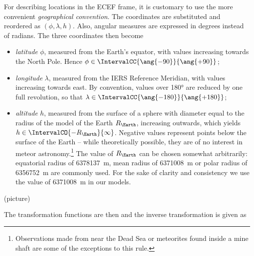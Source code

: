         For describing locations in the ECEF frame, it is customary to use the
        more convenient \emph{geographical convention}. The coordinates are substituted
        and reordered as $(\phi, \lambda, h)$.
        Also, angular measures are expressed in degrees instead of radians.
        The three coordinates then become
        \begin{itemize}
            \item \emph{latitude} $\phi$,
                measured from the Earth's equator, with values increasing towards the North Pole.
                Hence $\phi \in \IntervalCC{\ang{-90}}{\ang{+90}}$;
            \item \emph{longitude} $\lambda$, measured from the IERS Reference Meridian,
                with values increasing towards east. By convention, values over \ang{180} are
                reduced by one full revolution, so that $\lambda \in \IntervalCC{\ang{-180}}{\ang{+180}}$;
            \item \emph{altitude} $h$, measured from the surface of a sphere
                with diameter equal to the radius of the model of the Earth $R_\Earth$, increasing outwards,
                which yields $h \in \IntervalCO{-R_\Earth}{\infty}$.
                Negative values represent points below the surface of the Earth --
                while theoretically possible, they are of no interest in meteor
                astronomy.\footnote{Observations made from near the Dead Sea or meteorites
                found inside a mine shaft are some of the exceptions to this rule.}
                The value of $R_\Earth$ can be chosen somewhat arbitrarily:
                equatorial radius of \SI{6378137}{\metre}, mean radius of \SI{6371008}{\metre} or polar radius
                of \SI{6356752}{\metre} are commonly used.
                For the sake of clarity and consistency we use the value of \SI{6371008}{\metre} in our models.
        \end{itemize}

        (picture)

        The transformation functions are then
        and the inverse transformation is given as

